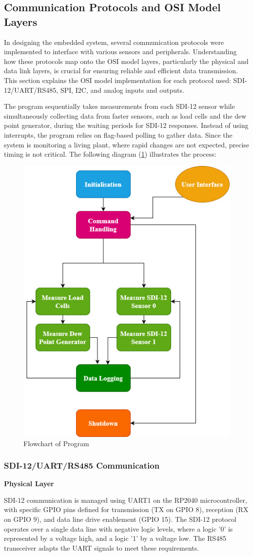 \subsection{Communication Protocols and OSI Model Layers}

In designing the embedded system, several communication protocols were implemented 
to interface with various sensors and peripherals. Understanding how these protocols 
map onto the OSI model layers, particularly the physical and data link layers, is 
crucial for ensuring reliable and efficient data transmission. This section explains 
the OSI model implementation for each protocol used: SDI-12/UART/RS485, SPI, I2C, 
and analog inputs and outputs.

The program sequentially takes measurements from each SDI-12 sensor while simultaneously 
collecting data from faster sensors, such as load cells and the dew point generator, during 
the waiting periods for SDI-12 responses. Instead of using interrupts, the program relies 
on flag-based polling to gather data. Since the system is monitoring a living plant, 
where rapid changes are not expected, precise timing is not critical. The following 
diagram (\cref{flowchart})  illustrates the process: 

\begin{figure}
    \includegraphics[width=0.4\linewidth]{figures/program_flowchart.jpg}
    \caption{Flowchart of Program}
    \label{flowchart}
\end{figure}

\subsubsection{SDI-12/UART/RS485 Communication}

\textbf{Physical Layer}

SDI-12 communication is managed using UART1 on the RP2040 microcontroller, with specific 
GPIO pins defined for transmission (TX on GPIO 8), reception (RX on GPIO 9), and data 
line drive enablement (GPIO 15). The SDI-12 protocol operates over a single data line 
with negative logic levels, where a logic '0' is represented by a voltage high, and a 
logic '1' by a voltage low. The RS485 transceiver adapts the UART signals to meet these requirements.

